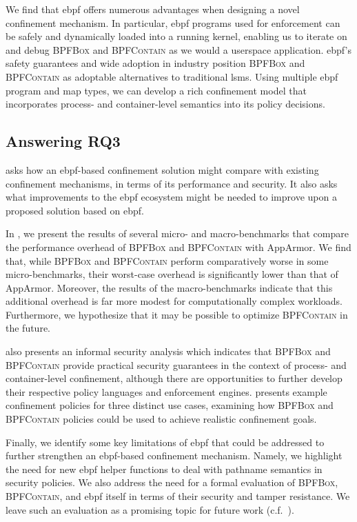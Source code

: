 \documentclass[
  fontsize=12pt,
  titlepage=firstiscover,
  paper=letter,
oneside,
  cleardoublepage=plain,
  parskip=half-,
  DIV=10,
  parindent,
  appendixprefix,
  chapterprefix,
  listof=totoc,
]{scrbook}
\newcommand{\bpfbox}{\textsc{BPFBox}}
\newcommand{\bpfcontain}{\textsc{BPFContain}}
\begin{document}
We find that \gls{ebpf} offers numerous advantages when designing a novel confinement
mechanism. In particular, \gls{ebpf} programs used for enforcement can be safely and
dynamically loaded into a running kernel, enabling us to iterate on and debug \bpfbox{}
and \bpfcontain{} as we would a userspace application. \gls{ebpf}'s safety guarantees and
wide adoption in industry position \bpfbox{} and \bpfcontain{} as adoptable alternatives
to traditional \glspl{lsm}. Using multiple \gls{ebpf} program and map types, we can
develop a rich confinement model that incorporates process- and container-level semantics
into its policy decisions.

\subsection{Answering RQ3}\label{ss:disc-rq3}


 asks how an \gls{ebpf}-based confinement solution might compare with existing
confinement mechanisms, in terms of its performance and security. It also asks what
improvements to the \gls{ebpf} ecosystem might be needed to improve upon a proposed
solution based on \gls{ebpf}.

In , we present the results of several micro- and macro-benchmarks that
compare the performance overhead of \bpfbox{} and \bpfcontain{} with AppArmor.  We find
that, while \bpfbox{} and \bpfcontain{} perform comparatively worse in some
micro-benchmarks, their worst-case overhead is significantly lower than that of AppArmor.
Moreover, the results of the macro-benchmarks indicate that this additional overhead
is far more modest for computationally complex workloads. Furthermore, we
hypothesize that it may be possible to optimize \bpfcontain{} in the future.

 also presents an informal security analysis which indicates that
\bpfbox{} and \bpfcontain{} provide practical security guarantees in the context of
process- and container-level confinement, although there are opportunities to further
develop their respective policy languages and enforcement engines. 
presents example confinement policies for three distinct use cases, examining how
\bpfbox{} and \bpfcontain{} policies could be used to achieve realistic confinement goals.

Finally, we identify some key limitations of \gls{ebpf} that could be addressed to further
strengthen an \gls{ebpf}-based confinement mechanism. Namely, we highlight the need for
new \gls{ebpf} helper functions to deal with pathname semantics in security policies.  We
also address the need for a formal evaluation of \bpfbox{}, \bpfcontain{}, and \gls{ebpf}
itself in terms of their security and tamper resistance. We leave such an evaluation as
a promising topic for future work (c.f.~).
\end{document}
